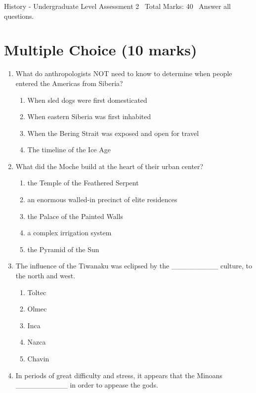 \documentclass[12pt]{article}
\begin{document}
\begin{center}
History - Undergraduate Level Assessment 2 \
Total Marks: 40 \
Answer all questions.
\end{center}

\section*{Multiple Choice (10 marks)}
\begin{enumerate}[label=\arabic*.]
\item What do anthropologists NOT need to know to determine when people entered the Americas from Siberia?
\begin{enumerate}[label=(\alph*)]
    \item When sled dogs were first domesticated
    \item When eastern Siberia was first inhabited
    \item When the Bering Strait was exposed and open for travel
    \item The timeline of the Ice Age
\end{enumerate}
\item What did the Moche build at the heart of their urban center?
\begin{enumerate}[label=(\alph*)]
    \item the Temple of the Feathered Serpent
    \item an enormous walled-in precinct of elite residences
    \item the Palace of the Painted Walls
    \item a complex irrigation system
    \item the Pyramid of the Sun
\end{enumerate}
\item The influence of the Tiwanaku was eclipsed by the \_\_\_\_\_\_\_\_\_ culture, to the north and west.
\begin{enumerate}[label=(\alph*)]
    \item Toltec
    \item Olmec
    \item Inca
    \item Nazca
    \item Chavin
\end{enumerate}
\item In periods of great difficulty and stress, it appears that the Minoans \_\_\_\_\_\_\_\_\_\_ in order to appease the gods.
\begin{enumerate}[label=(\alph*)]

\end{enumerate}
\end{enumerate}
\end{document}
